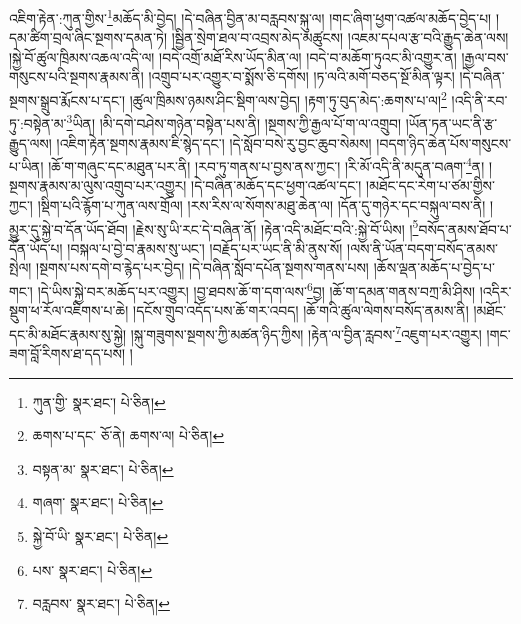 འཇིག་རྟེན་:ཀུན་གྱིས་\footnote{ཀུན་གྱི་  སྣར་ཐང་།  པེ་ཅིན། }མཆོད་མི་བྱེད། །དེ་བཞིན་བྱིན་མ་བརླབས་སྐུ་ལ། །གང་ཞིག་ཕྱག་འཚལ་མཆོད་བྱེད་པ། །དམ་ཚིག་བྲལ་ཞིང་སྔགས་དམན་ཏེ། །སྦྱིན་སྲེག་ཐལ་བ་འབྲས་མེད་མཚུངས། །འཇམ་དཔལ་རྩ་བའི་རྒྱུད་ཆེན་ལས། །སྐྱེ་བོ་ཚུལ་ཁྲིམས་འཆལ་འདི་ལ། །བདེ་འགྲོ་མཐོ་རིས་ཡོད་མིན་ལ། །བདེ་བ་མཆོག་ཏུའང་མི་འགྱུར་ན། །རྒྱལ་བས་གསུངས་པའི་སྔགས་རྣམས་ནི། །འགྲུབ་པར་འགྱུར་བ་སྨོས་ཅི་དགོས། །ཏ་ལའི་མགོ་བཅད་སྔོ་མིན་ལྟར། །དེ་བཞིན་སྔགས་སྒྲུབ་རྨོངས་པ་དང་། །ཚུལ་ཁྲིམས་ཉམས་ཤིང་སྡིག་ལས་བྱེད། །རྟག་ཏུ་བུད་མེད་:ཆགས་པ་ལ།\footnote{ཆགས་པ་དང་  ཅོ་ནེ། ཆགས་ལ།  པེ་ཅིན། } །འདི་ནི་རབ་ཏུ་:བསྟེན་མ་\footnote{བསྟན་མ་  སྣར་ཐང་།  པེ་ཅིན། }ཡིན། །མི་དགེ་བཤེས་གཉེན་བསྟེན་པས་ནི། །སྔགས་ཀྱི་རྒྱལ་པོ་ག་ལ་འགྲུབ། །ཡོན་ཏན་ཡང་ནི་རྩ་རྒྱུད་ལས། །འཇིག་རྟེན་སྔགས་རྣམས་ཇི་སྙེད་དང་། །དེ་སློབ་བསེ་རུ་བྱང་ཆུབ་སེམས། །བདག་ཉིད་ཆེན་པོས་གསུངས་པ་ཡིན། །ཆོ་ག་གཞུང་དང་མཐུན་པར་ནི། །རབ་ཏུ་གནས་པ་བྱས་ནས་ཀྱང་། །རི་མོ་འདི་ནི་མདུན་བཞག་\footnote{གཞག་  སྣར་ཐང་།  པེ་ཅིན། }ན། །སྔགས་རྣམས་མ་ལུས་འགྲུབ་པར་འགྱུར། །དེ་བཞིན་མཆོད་དང་ཕྱག་འཚལ་དང་། །མཐོང་དང་རེག་པ་ཙམ་གྱིས་ཀྱང་། །སྡིག་པའི་རྙོག་པ་ཀུན་ལས་གྲོལ། །རས་རིས་ལ་སོགས་མཐུ་ཆེན་ལ། །དོན་དུ་གཉེར་དང་བསྐུལ་བས་ནི། །མྱུར་དུ་སྐྱེ་བ་དོན་ཡོད་ཐོབ། །རྗེས་སུ་ཡི་རང་དེ་བཞིན་ནོ། །རྟེན་འདི་མཐོང་བའི་:སྐྱེ་བོ་ཡིས། །\footnote{སྐྱེ་བོ་ཡི་  སྣར་ཐང་།  པེ་ཅིན། }བསོད་ནམས་ཐོབ་པ་དོན་ཡོད་པ། །བསྐལ་པ་བྱེ་བ་རྣམས་སུ་ཡང་། །བརྗོད་པར་ཡང་ནི་མི་ནུས་སོ། །ལས་ནི་ཡོན་བདག་བསོད་ནམས་སྤེལ། །སྔགས་པས་དགེ་བ་རྙེད་པར་བྱེད། །དེ་བཞིན་སློབ་དཔོན་སྔགས་གནས་པས། །ཆོས་ལྡན་མཆོད་པ་བྱེད་པ་གང་། །དེ་ཡིས་སྐྱེ་བར་མཆོད་པར་འགྱུར། །བྱ་ཐབས་ཆོ་ག་དག་ལས་\footnote{པས་  སྣར་ཐང་།  པེ་ཅིན། }བྱ། །ཆོ་ག་དམན་གནས་བཀྲ་མི་ཤིས། །འདིར་སྡུག་ཕ་རོལ་འཇིགས་པ་ཆེ། །དངོས་གྲུབ་འདོད་པས་ཆོ་གར་འབད། །ཆོ་གའི་ཚུལ་ལེགས་བསོད་ནམས་ནི། །མཐོང་དང་མི་མཐོང་རྣམས་སུ་སྐྱེ། །སྐུ་གཟུགས་སྔགས་ཀྱི་མཚན་ཉིད་ཀྱིས། །རྟེན་ལ་བྱིན་རླབས་\footnote{བརླབས་  སྣར་ཐང་།  པེ་ཅིན། }འཇུག་པར་འགྱུར། །གང་ཟག་བློ་རིགས་ཐ་དད་པས། །
